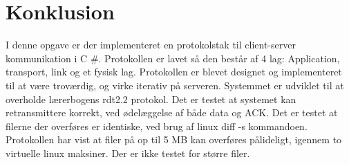 \chapter{Konklusion}\label{ch:konclusion}
I denne opgave er der implementeret en protokolstak til client-server kommunikation i C \#. Protokollen er lavet så den består af 4 lag: Application, transport, link og et fysisk lag. Protokollen er blevet designet og implementeret til at være troværdig, og virke iterativ på serveren. Systemmet er udviklet til at overholde lærerbogens rdt2.2 protokol. Det er testet at systemet kan retransmittere korrekt, ved ødelæggelse af både data og ACK. Det er testet at filerne der overføres er identiske, ved brug af linux diff -s kommandoen. Protokollen har vist at filer på op til 5 MB kan overføres pålideligt, igennem to virtuelle linux maksiner. Der er ikke testet for større filer. 